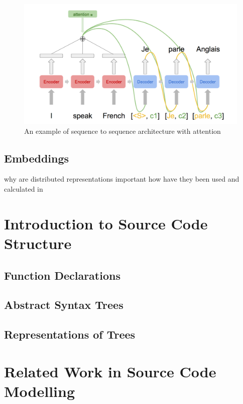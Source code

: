 \begin{figure}[tb]
    \centering
    \includegraphics[width=\linewidth]{ModelPics/attention2.png}
    \caption{An example of sequence to sequence architecture with attention}
    \label{fig:attention}
\end{figure}


\subsection{Embeddings} %
\label{sub:embeddings}

why are distributed representations important
how have they been used and calculated in 

\section{Introduction to Source Code Structure} %
\label{sec:translating_code}

\subsection{Function Declarations} %
\label{sub:function_declarations}

\subsection{Abstract Syntax Trees} %
\label{sub:abstract_syntax_trees}

\subsection{Representations of Trees}

\blindtext

\section{Related Work in Source Code Modelling}

